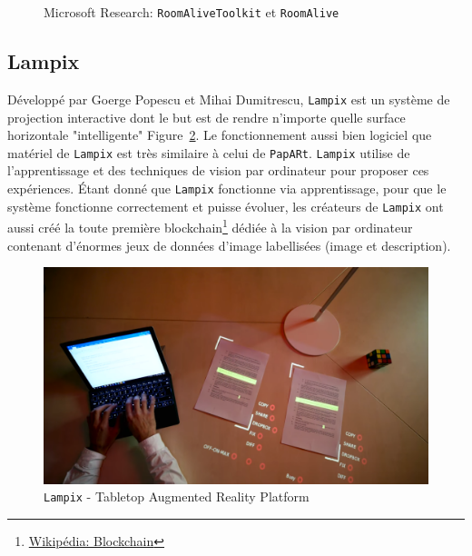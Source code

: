 \begin{figure}[H]
    \centering
\caption{Microsoft Research: \texttt{RoomAliveToolkit} et \texttt{RoomAlive}\protect\footnotemark}
\label{fig:roomalive}
\end{figure}

\subsection{Lampix} 
Développé par Goerge Popescu et Mihai Dumitrescu, \texttt{Lampix} est un système de projection interactive dont le but est de rendre n'importe quelle surface horizontale "intelligente" Figure~\ref{fig:lampix}. Le fonctionnement aussi bien logiciel que matériel de \texttt{Lampix} est très similaire à celui de \texttt{\texttt{PapARt}}. \texttt{Lampix} utilise de l'apprentissage et des techniques de vision par ordinateur pour proposer ces expériences. Étant donné que \texttt{Lampix} fonctionne via apprentissage, pour que le système fonctionne correctement et puisse évoluer, les créateurs de \texttt{Lampix} ont aussi créé la toute première blockchain\footnote{\href{https://fr.wikipedia.org/wiki/Blockchain}{Wikipédia: Blockchain}} dédiée à la vision par ordinateur contenant d'énormes jeux de données d'image labellisées (image et description).
     
\begin{figure}[H]
\centering
\includegraphics[width=0.7\linewidth]{images/lampix}
\caption{\texttt{Lampix} - Tabletop Augmented Reality Platform\protect\footnotemark}
\label{fig:lampix}
\end{figure} 

